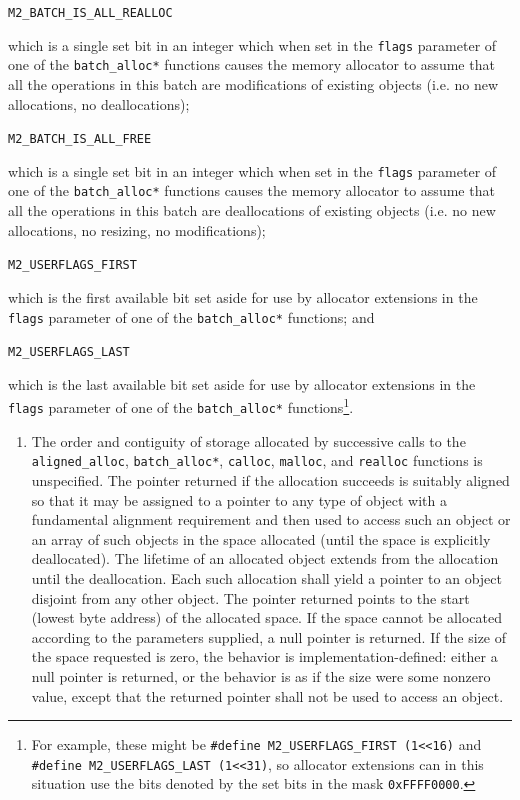 \documentclass[wd]{isov2}
\begin{document}
{\begin{enumerate}
\texttt{M2\_BATCH\_IS\_ALL\_REALLOC}

which is a single set bit in an integer which when set in the \texttt{flags} parameter of one of the \texttt{batch\_alloc*} functions causes the memory allocator to assume that all the operations in this batch are modifications of existing objects (i.e. no new allocations, no deallocations);

\texttt{M2\_BATCH\_IS\_ALL\_FREE}

which is a single set bit in an integer which when set in the \texttt{flags} parameter of one of the \texttt{batch\_alloc*} functions causes the memory allocator to assume that all the operations in this batch are deallocations of existing objects (i.e. no new allocations, no resizing, no modifications);

\texttt{M2\_USERFLAGS\_FIRST}

which is the first available bit set aside for use by allocator extensions in the \texttt{flags} parameter of one of the \texttt{batch\_alloc*} functions; and

\texttt{M2\_USERFLAGS\_LAST}

which is the last available bit set aside for use by allocator extensions in the \texttt{flags} parameter of one of the \texttt{batch\_alloc*} functions\footnote{For example, these might be \texttt{\#define M2\_USERFLAGS\_FIRST (1<<16)} and \texttt{\#define M2\_USERFLAGS\_LAST (1<<31)}, so allocator extensions can in this situation use the bits denoted by the set bits in the mask \texttt{0xFFFF0000}.}.
\end{enumerate}

\begin{enumerate}
\renewcommand{\theenumi}{\arabic{enumi}}
\item The order and contiguity of storage allocated by successive calls to the \texttt{aligned\_alloc}, \textcolor{changed}{\texttt{batch\_alloc*}}, \texttt{calloc}, \texttt{malloc}, and \texttt{realloc} functions is unspecified. The pointer returned if the allocation succeeds is suitably aligned so that it may be assigned to a pointer to any type of object with a fundamental alignment requirement and then used to access such an object or an array of such objects in the space allocated (until the space is explicitly deallocated). The lifetime of an allocated object extends from the allocation until the deallocation. Each such allocation shall yield a pointer to an object disjoint from any other object. The pointer returned points to the start (lowest byte address) of the allocated space. If the space cannot be allocated \textcolor{changed}{according to the parameters supplied}, a null pointer is returned. If the size of the space requested is zero, the behavior is implementation-defined: either a null pointer is returned, or the behavior is as if the size were some nonzero value, except that the returned pointer shall not be used to access an object.
\end{enumerate}

}
\end{document}
